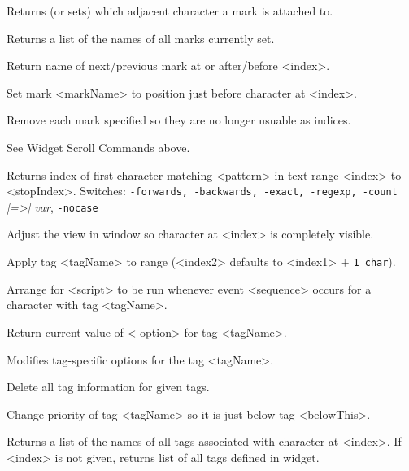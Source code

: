 \begin{enum}{1cm}
Returns (or sets) which adjacent character a mark is attached to.

Returns a list of the names of all marks currently set.

Return name of next/previous mark at or after/before <index>.

Set mark <markName> to position just before character at <index>.

Remove each mark specified so they are no longer usuable as indices.

See Widget Scroll Commands above.

Returns index of first character matching <pattern> in text range
<index> to <stopIndex>. Switches: {\small {\tt -forwards, -backwards,
-exact, -regexp, -count} {\it |=>| var}, {\tt -nocase}}

Adjust the view in window so character at <index> is completely visible.

Apply tag <tagName> to range (<index2> defaults to <index1> $+$ {\tt 1 char}).

Arrange for <script> to be run whenever event <sequence> occurs
for a character with tag <tagName>.

Return current value of <-option> for tag <tagName>.

Modifies tag-specific options for the tag <tagName>.

Delete all tag information for given tags.

Change priority of tag <tagName> so it is just below tag <belowThis>.

Returns a list of the names of all tags associated with character at <index>.
If <index> is not given, returns list of all tags defined in widget.


\end{enum}
